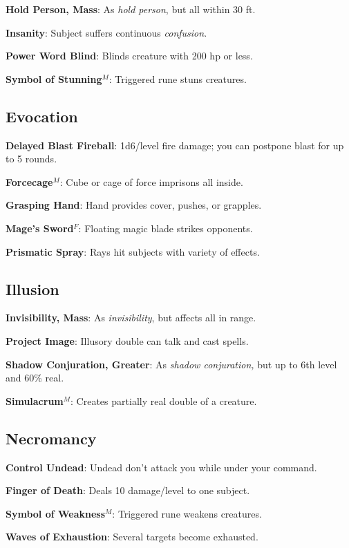 \textbf{Hold Person, Mass}: As \textit{hold person}, but all within 30 ft.

\textbf{Insanity}: Subject suffers continuous \textit{confusion}.

\textbf{Power Word Blind}: Blinds creature with 200 hp or less.

\textbf{Symbol of Stunning}\(^{M}\): Triggered rune stuns creatures.

\subsection{Evocation}


\textbf{Delayed Blast Fireball}: 1d6/level fire damage; you can postpone blast for up to 5 rounds.

\textbf{Forcecage}\(^{M}\): Cube or cage of force imprisons all inside.

\textbf{Grasping Hand}: Hand provides cover, pushes, or grapples.

\textbf{Mage's Sword}\(^{F}\): Floating magic blade strikes opponents.

\textbf{Prismatic Spray}: Rays hit subjects with variety of effects.

\subsection{Illusion}


\textbf{Invisibility, Mass}: As \textit{invisibility}, but affects all in range.

\textbf{Project Image}: Illusory double can talk and cast spells.

\textbf{Shadow Conjuration, Greater}: As \textit{shadow conjuration, }but up to 6th level and 60\% real.

\textbf{Simulacrum}\(^{M}\): Creates partially real double of a creature.

\subsection{Necromancy}


\textbf{Control Undead}: Undead don't attack you while under your command.

\textbf{Finger of Death}: Deals 10 damage/level to one subject.

\textbf{Symbol of Weakness}\(^{M}\): Triggered rune weakens creatures.

\textbf{Waves of Exhaustion}: Several targets become exhausted.

